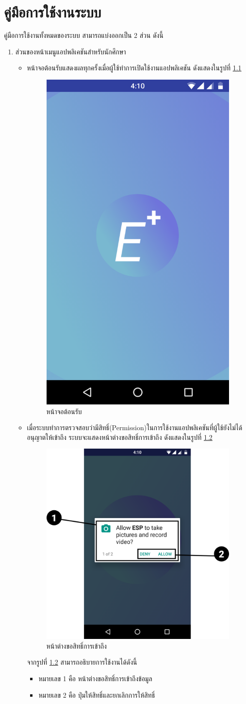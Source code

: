 \chapter{คู่มือการใช้งานระบบ}
คู่มือการใช้งานทั้งหมดของระบบ สามารถแบ่งออกเป็น 2 ส่วน ดังนี้
\begin{enumerate}
	\item ส่วนของหน้าเมนูแอปพลิเคชันสำหรับนักศึกษา
		\begin{itemize}
			\item หน้าจอต้อนรับแสดงผลทุกครั้งเมื่อผู้ใช้ทำการเปิดใช้งานแอปพลิเคชัน ดังแสดงในรูปที่ \ref{Fig:open}
				\begin{figure}[H]
					\centering
					\includegraphics[width=0.3\columnwidth]{Figures/7/Manual/open}
					\caption{หน้าจอต้อนรับ}
					\label{Fig:open}
				\end{figure}
			
			\item เมื่อระบบทำการตรวจสอบว่ามีสิทธิ์(Permission)ในการใช้งานแอปพลิเคชันที่ผู้ใช้ยังไม่ได้อนุญาตให้เข้าถึง ระบบจะแสดงหน้าต่างขอสิทธิ์การเข้าถึง ดังแสดงในรูปที่ \ref{Fig:permission}
			\begin{figure}[H]
				\centering
				\includegraphics[width=0.5\columnwidth]{Figures/7/Manual/permission}
				\caption{หน้าต่างขอสิทธิ์การเข้าถึง}
				\label{Fig:permission}
			\end{figure}
		จากรูปที่ \ref{Fig:permission} สามารถอธิบายการใช้งานได้ดังนี้
			\begin{itemize}[label={--}]
				\item หมายเลข 1 คือ หน้าต่างขอสิทธิ์การเข้าถึงข้อมูล
				\item หมายเลข 2 คือ ปุ่มให้สิทธิ์และยกเลิกการให้สิทธิ์
			\end{itemize}
			

\end{itemize}
\end{enumerate}
